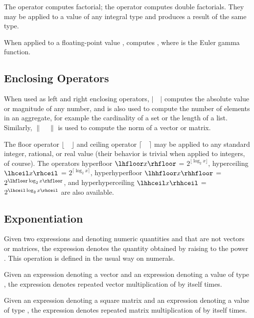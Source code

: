 The operator \EXP{!} computes factorial; the operator \EXP{!!}
computes double factorials.
They may be applied to a value of any integral type and produces a
result of the same type.

When applied to a floating-point value ,  computes
, where \EXP{\Gamma} is the Euler gamma function.

\subsection{Enclosing Operators}

When used as left and right enclosing operators, $|\quad|$ computes the
absolute value or magnitude of any number, and is also used to compute
the number of elements in an aggregate, for example the cardinality
of a set or the length of a list.  Similarly, $\|\quad\|$ is used
to compute the norm of a vector or matrix.

The floor operator $\lfloor\quad\rfloor$ and ceiling operator
$\lceil\quad\rceil$
may be applied to any standard integer, rational, or real value (their behavior
is trivial when applied to integers, of course).  The operators
hyperfloor $\lhfloor x \rhfloor$ = $2^{\lfloor \log_2 x \rfloor}$,
hyperceiling $\lhceil x \rhceil$ = $2^{\lceil \log_2 x \rceil}$,
hyperhyperfloor $\lhhfloor x \rhhfloor$ = $2^{\lhfloor \log_2 x \rhfloor}$,
and hyperhyperceiling $\lhhceil x \rhhceil$ = $2^{\lhceil \log_2 x
  \rhceil}$ are also available.

\subsection{Exponentiation}
Given two expressions  and  denoting numeric quantities  and  that
are not vectors or matrices,
the expression  denotes the quantity obtained by raising  to the power .
This operation is defined in the usual way on numerals.

Given an expression  denoting a vector and an expression  denoting a value
of type , the expression  denotes repeated vector multiplication
of  by itself  times.

Given an expression  denoting a square matrix and an expression  denoting a value
of type , the expression  denotes repeated matrix multiplication
of  by itself  times.

